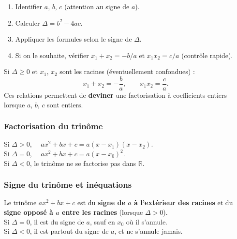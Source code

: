 \documentclass[12pt,a4paper]{article}
\begin{document}
\begin{methodebox}[-- Résoudre $ax^2+bx+c=0$]
\begin{enumerate}[leftmargin=1.3cm]
  \item Identifier $a$, $b$, $c$ (attention au signe de $a$).
  \item Calculer $\Delta=b^2-4ac$.
  \item Appliquer les formules selon le signe de $\Delta$.
  \item Si on le souhaite, vérifier $x_1+x_2=-b/a$ et $x_1x_2=c/a$ (contrôle rapide).
\end{enumerate}
\end{methodebox}

\begin{propbox}
Si $\Delta\geqslant 0$ et $x_1$, $x_2$ sont les racines (éventuellement confondues) :
$$x_1+x_2 = -\frac{b}{a}, \qquad x_1x_2 = \frac{c}{a}.$$
Ces relations permettent de \textbf{deviner} une factorisation à coefficients entiers lorsque $a$, $b$, $c$ sont entiers.
\end{propbox}

\subsubsection{Factorisation du trinôme}

\begin{propbox}[Factorisation]
Si $\Delta>0$, $\quad ax^2+bx+c = a(x-x_1)(x-x_2)$.\\
Si $\Delta=0$, $\quad ax^2+bx+c = a(x-x_0)^2$.\\
Si $\Delta<0$, le trinôme ne se factorise pas dans $\mathbb{R}$.
\end{propbox}

\subsubsection{Signe du trinôme et inéquations}

\begin{propbox}
Le trinôme $ax^2+bx+c$ est du \textbf{signe de $a$ à l'extérieur des racines} et du \textbf{signe opposé à $a$ entre les racines} (lorsque $\Delta>0$).\\
Si $\Delta=0$, il est du signe de $a$, sauf en $x_0$ où il s'annule.\\
Si $\Delta<0$, il est partout du signe de $a$, et ne s'annule jamais.
\end{propbox}
\end{document}
